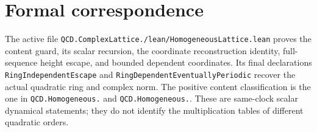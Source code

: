 \documentclass[11pt,letterpaper]{article}
\begin{document}
\section{Formal correspondence}

The active file \texttt{QCD.\allowbreak Complex\allowbreak Lattice./\allowbreak lean/\allowbreak Homogeneous\allowbreak Lattice.\allowbreak lean}
proves the content guard, its scalar recursion, the coordinate reconstruction identity, full-sequence height escape, and bounded dependent coordinates.
Its final declarations \texttt{Ring\allowbreak Independent\allowbreak Escape} and
\texttt{Ring\allowbreak Dependent\allowbreak Eventually\allowbreak Periodic} recover the actual quadratic ring and complex norm.
The positive content classification is the one in
\texttt{QCD.\allowbreak Homogeneous.} and \texttt{QCD.\allowbreak Homogeneous.}.
These are same-clock scalar dynamical statements; they do not identify the multiplication tables of different quadratic orders.
\end{document}
